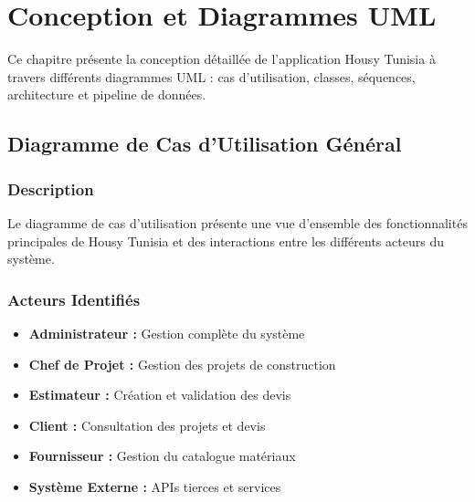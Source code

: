 \chapter{Conception et Diagrammes UML}

\begin{objectivebox}
Ce chapitre présente la conception détaillée de l'application Housy Tunisia à travers différents diagrammes UML : cas d'utilisation, classes, séquences, architecture et pipeline de données.
\end{objectivebox}

\section{Diagramme de Cas d'Utilisation Général}

\subsection{Description}

Le diagramme de cas d'utilisation présente une vue d'ensemble des fonctionnalités principales de Housy Tunisia et des interactions entre les différents acteurs du système.

\subsection{Acteurs Identifiés}

\begin{itemize}
    \item \textbf{Administrateur :} Gestion complète du système
    \item \textbf{Chef de Projet :} Gestion des projets de construction
    \item \textbf{Estimateur :} Création et validation des devis
    \item \textbf{Client :} Consultation des projets et devis
    \item \textbf{Fournisseur :} Gestion du catalogue matériaux
    \item \textbf{Système Externe :} APIs tierces et services
\end{itemize}

